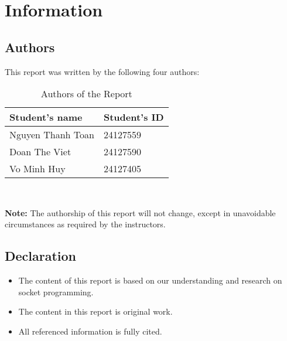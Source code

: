 \section{Information}
\subsection{Authors}
This report was written by the following four authors:

\begin{table}[H]
    \centering
    \begin{tabular}{|l|l|}
        \hline
        \textbf{Student's name } & \textbf{Student's ID} \\ \hline
        Nguyen Thanh Toan & 24127559 \\ \hline
        Doan The Viet & 24127590 \\ \hline
        Vo Minh Huy & 24127405 \\ \hline
    \end{tabular}\\
\caption{Authors of the Report}
    \label{tab:authors}
\end{table}



\textbf{Note:} The authorship of this report will not change, except in unavoidable circumstances as required by the instructors.

\subsection{Declaration}
\begin{itemize}
    \item The content of this report is based on our understanding and research on socket programming.
    \item The content in this report is original work.
    \item All referenced information is fully cited.
\end{itemize}



